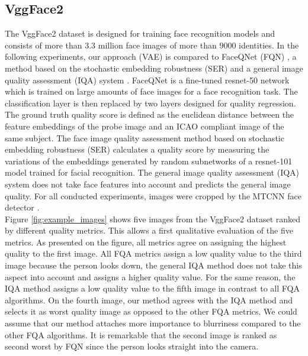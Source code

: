 \documentclass[letterpaper]{article} %
\begin{document}
\subsection{VggFace2}
The VggFace2 dataset \cite{Cao18} is designed for training face recognition models and consists of more than 3.3 million face images of more than 9000 identities. In the following experiments, our approach (VAE) is compared to FaceQNet (FQN) \cite{hernandez2020biometric}, a method based on the stochastic embedding robustness (SER) \cite{terhorst2020ser} and a general image quality assessment (IQA) system \cite{talebi2018nima}. FaceQNet is a fine-tuned resnet-50 network \cite{he2016deep} which is trained on large amounts of face images for a face recognition task. The classification layer is then replaced by two layers designed for quality regression. The ground truth quality score is defined as the euclidean distance between the feature embeddings of the probe image and an ICAO compliant image of the same subject. The face image quality assessment method based on stochastic embedding robustness (SER) calculates a quality score by measuring the variations of the embeddings generated by random subnetworks of a resnet-101 \cite{he2016deep} model trained for facial recognition. The general image quality assessment (IQA) system \cite{talebi2018nima} does not take face features into account and predicts the general image quality. For all conducted experiments, images were cropped by the MTCNN face detector \cite{zhang2016joint}.
\\
\newline
Figure \ref{fig:example_images} shows five images from the VggFace2 dataset \cite{Cao18} ranked by different quality metrics. This allows a first qualitative evaluation of the five metrics. As presented on the figure, all metrics agree on assigning the highest quality to the first image. All FQA metrics assign a low quality value to the third image because the person looks down, the general IQA method does not take this aspect into account and assigns a higher quality value. For the same reason, the IQA method assigns a low quality value to the fifth image in contrast to all FQA algorithms. On the fourth image, our method agrees with the IQA method and selects it as worst quality image as opposed to the other FQA metrics. We could assume that our method attaches more importance to blurriness compared to the other FQA algorithms. It is remarkable that the second image is ranked as second worst by FQN since the person looks straight into the camera.
\end{document}
